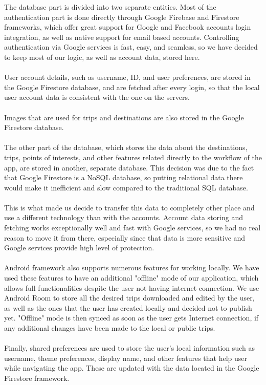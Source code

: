 The database part is divided into two separate entities. Most of the authentication part is done directly through Google Firebase and Firestore frameworks, which offer great support for Google and Facebook accounts login integration, as well as native support for email based accounts. Controlling authentication via Google services is fast, easy, and seamless, so we have decided to keep most of our logic, as well as account data, stored here. \\ \\
User account details, such as username, ID, and user preferences, are stored in the Google Firestore database, and are fetched after every login, so that the local user account data is consistent with the one on the servers. \\ \\
Images that are used for trips and destinations are also stored in the Google Firestore database.\\ \\
The other part of the database, which stores the data about the destinations, trips, points of interests, and other features related directly to the workflow of the app, are stored in another, separate database. This decision was due to the fact that Google Firestore is a NoSQL database, so putting relational data there would make it inefficient and slow compared to the traditional SQL database.\\ \\
This is what made us decide to transfer this data to completely other place and use a different technology than with the accounts. Account data storing and fetching works exceptionally well and fast with Google services, so we had no real reason to move it from there, especially since that data is more sensitive and Google services provide high level of protection. \\ \\
Android framework also supports numerous features for working locally. We have used these features to have an additional "offline" mode of our application, which allows full functionalities despite the user not having internet connection. We use Android Room to store all the desired trips downloaded and edited by the user, as well as the ones that the user has created locally and decided not to publish yet. "Offline" mode is then synced as soon as the user gets Internet connection, if any additional changes have been made to the local or public trips. \\ \\
Finally, shared preferences are used to store the user's local information such as username, theme preferences, display name, and other features that help user while navigating the app. These are updated with the data located in the Google Firestore framework.\\
\\

